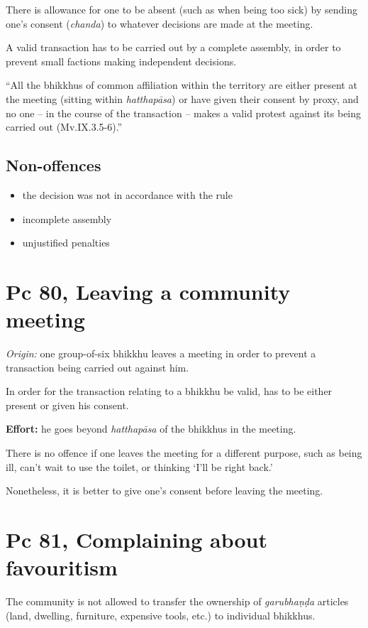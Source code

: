 There is allowance for one to be absent (such as when being too sick) by
sending one's consent (\emph{chanda}) to whatever decisions are made at
the meeting.

A valid transaction has to be carried out by a complete assembly, in
order to prevent small factions making independent decisions.

``All the bhikkhus of common affiliation within the territory are either
present at the meeting (sitting within \emph{hatthapāsa}) or have given
their consent by proxy, and no one -- in the course of the transaction
-- makes a valid protest against its being carried out (Mv.IX.3.5-6).''

\subsection{Non-offences}

\begin{itemize}
\tightlist
\item
  the decision was not in accordance with the rule
\item
  incomplete assembly
\item
  unjustified penalties
\end{itemize}

\section{Pc 80, Leaving a community meeting}

\emph{Origin:} one group-of-six bhikkhu leaves a meeting in order to
prevent a transaction being carried out against him.

In order for the transaction relating to a bhikkhu be valid, has to be
either present or given his consent.

\textbf{Effort:} he goes beyond \emph{hatthapāsa} of the bhikkhus in the
meeting.

There is no offence if one leaves the meeting for a different purpose,
such as being ill, can't wait to use the toilet, or thinking `I'll be
right back.'

Nonetheless, it is better to give one's consent before leaving the
meeting.

\section{Pc 81, Complaining about favouritism}

The community is not allowed to transfer the ownership of
\emph{garubhaṇḍa} articles (land, dwelling, furniture, expensive tools,
etc.) to individual bhikkhus.

